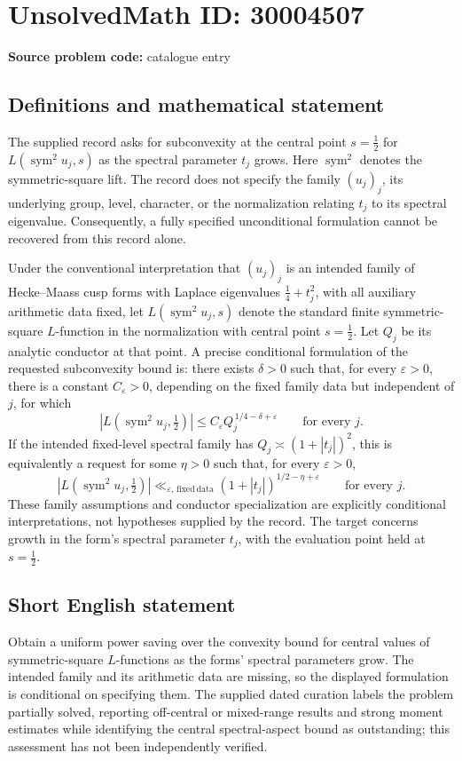 \documentclass[11pt]{article}
\begin{document}
\section*{UnsolvedMath ID: 30004507}
\textbf{Source problem code:} catalogue entry
\subsection{Definitions and mathematical statement}
The supplied record asks for subconvexity at the central point \(s=\tfrac12\) for \(L(\operatorname{sym}^{2}u_j,s)\) as the spectral parameter \(t_j\) grows. Here \(\operatorname{sym}^{2}\) denotes the symmetric-square lift. The record does not specify the family \((u_j)_j\), its underlying group, level, character, or the normalization relating \(t_j\) to its spectral eigenvalue. Consequently, a fully specified unconditional formulation cannot be recovered from this record alone.

Under the conventional interpretation that \((u_j)_j\) is an intended family of Hecke--Maass cusp forms with Laplace eigenvalues \(\tfrac14+t_j^2\), with all auxiliary arithmetic data fixed, let \(L(\operatorname{sym}^{2}u_j,s)\) denote the standard finite symmetric-square \(L\)-function in the normalization with central point \(s=\tfrac12\). Let \(Q_j\) be its analytic conductor at that point. A precise conditional formulation of the requested subconvexity bound is: there exists \(\delta>0\) such that, for every \(\varepsilon>0\), there is a constant \(C_{\varepsilon}>0\), depending on the fixed family data but independent of \(j\), for which
\[
\left|L\!\left(\operatorname{sym}^{2}u_j,\tfrac12\right)\right|
\le C_{\varepsilon}Q_j^{\,1/4-\delta+\varepsilon}
\qquad\text{for every }j.
\]
If the intended fixed-level spectral family has \(Q_j\asymp(1+|t_j|)^2\), this is equivalently a request for some \(\eta>0\) such that, for every \(\varepsilon>0\),
\[
\left|L\!\left(\operatorname{sym}^{2}u_j,\tfrac12\right)\right|
\ll_{\varepsilon,\,\mathrm{fixed\ data}}
(1+|t_j|)^{1/2-\eta+\varepsilon}
\qquad\text{for every }j.
\]
These family assumptions and conductor specialization are explicitly conditional interpretations, not hypotheses supplied by the record. The target concerns growth in the form's spectral parameter \(t_j\), with the evaluation point held at \(s=\tfrac12\).
\subsection{Short English statement}
Obtain a uniform power saving over the convexity bound for central values of symmetric-square \(L\)-functions as the forms' spectral parameters grow. The intended family and its arithmetic data are missing, so the displayed formulation is conditional on specifying them. The supplied dated curation labels the problem partially solved, reporting off-central or mixed-range results and strong moment estimates while identifying the central spectral-aspect bound as outstanding; this assessment has not been independently verified.
\end{document}
